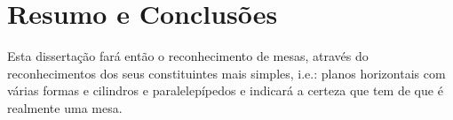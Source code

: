 

\section{Resumo e Conclusões}

Esta dissertação fará então o reconhecimento de mesas, através do reconhecimentos dos seus constituintes mais simples, i.e.: planos horizontais com várias formas e cilindros e paralelepípedos e indicará a certeza que tem
de que é realmente uma mesa.